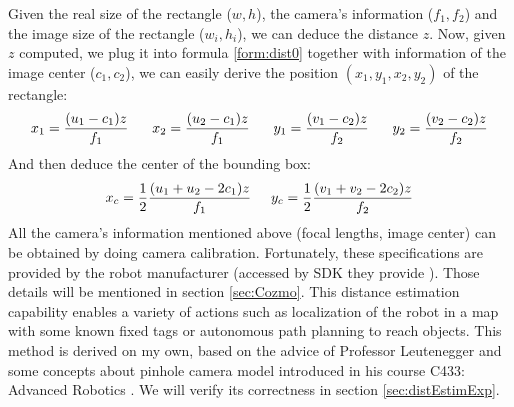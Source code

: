 Given the real size of the rectangle ($w, h$), the camera's information ($f_1, f_2$) and the image size of the rectangle ($w_i, h_i$), we can deduce the distance $z$. Now, given $z$ computed, we plug it into formula \ref{form:dist0} together with information of the image center ($c_1, c_2$), we can easily derive the position $(x_1, y_1, x_2, y_2)$ of the rectangle:
\begin{align}
	x_1 = \frac{(u_1 - c_1)z}{f_1} \hspace{0.6cm}
	x_2 = \frac{(u_2 - c_1)z}{f_1} \hspace{0.6cm}
	y_1 = \frac{(v_1 - c_2)z}{f_2} \hspace{0.6cm}
	y_2 = \frac{(v_2 - c_2)z}{f_2} 
\end{align}
And then deduce the center of the bounding box:
\begin{align}
	\label{form:centerIm}
x_c = \frac{1}{2}\frac{(u_1 + u_2 - 2 c_1)z}{f_1} \hspace{0.5cm} y_c = \frac{1}{2}\frac{(v_1 + v_2 - 2 c_2)z}{f_2}
\end{align}
All the camera's information mentioned above (focal lengths, image center) can be obtained by doing camera calibration. Fortunately, these specifications are provided by the robot manufacturer (accessed by SDK they provide \cite{ANKI:2017}). Those details will be mentioned in section \ref{sec:Cozmo}.
This distance estimation capability enables a variety of actions such as localization of the robot in a map with some known fixed tags or autonomous path planning to reach objects. This method is derived on my own, based on the advice of Professor Leutenegger and some concepts about pinhole camera model introduced in his course C433: Advanced Robotics \cite{c433}. We will verify its correctness in section \ref{sec:distEstimExp}.
